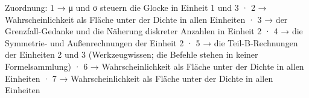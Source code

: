 
Zuordnung: 1 → μ und σ steuern die Glocke in Einheit 1 und 3 · 2 → Wahrscheinlichkeit als Fläche unter der Dichte in allen Einheiten · 3 → der Grenzfall-Gedanke und die Näherung diskreter Anzahlen in Einheit 2 · 4 → die Symmetrie- und Außenrechnungen der Einheit 2 · 5 → die Teil-B-Rechnungen der Einheiten 2 und 3 (Werkzeugwissen; die Befehle stehen in keiner Formelsammlung) · 6 → Wahrscheinlichkeit als Fläche unter der Dichte in allen Einheiten · 7 → Wahrscheinlichkeit als Fläche unter der Dichte in allen Einheiten

